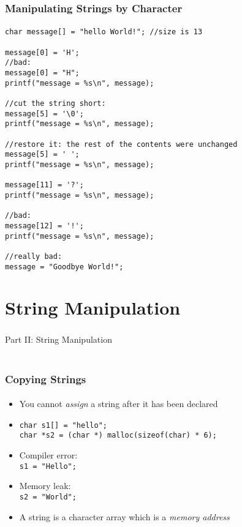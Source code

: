 \documentclass[]{beamer}
\begin{document}
\begin{frame}[fragile]
    \frametitle{Manipulating Strings by Character}
    \framesubtitle{}

\begin{verbatim}
char message[] = "hello World!"; //size is 13

message[0] = 'H';
//bad:
message[0] = "H";
printf("message = %s\n", message);

//cut the string short:
message[5] = '\0';
printf("message = %s\n", message);

//restore it: the rest of the contents were unchanged
message[5] = ' ';
printf("message = %s\n", message);

message[11] = '?';
printf("message = %s\n", message);

//bad:
message[12] = '!';
printf("message = %s\n", message);

//really bad:
message = "Goodbye World!";
\end{verbatim}
  
\end{frame}

\section{String Manipulation}

\begin{frame}
    \frametitle{}
    \framesubtitle{}
    
    \begin{center}
    {\Huge Part II: String Manipulation}\\
    {\Large ~}
    
    \end{center}

\end{frame}

\begin{frame}[fragile]
    \frametitle{Copying Strings}
    \framesubtitle{}

\begin{itemize}[<+->]
  \item You cannot \emph{assign} a string after it has been declared
  \item[~]
\begin{verbatim}
char s1[] = "hello";
char *s2 = (char *) malloc(sizeof(char) * 6);
\end{verbatim}
  \item Compiler error: \\
  \texttt{s1 = "Hello";}
  \item Memory leak: \\
  \texttt{s2 = "World";}
  \item A string is a character array which is a \emph{memory address}
\end{itemize}
  
\end{frame}
\end{document}

